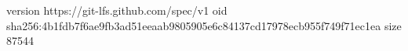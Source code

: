 version https://git-lfs.github.com/spec/v1
oid sha256:4b1fdb7f6ae9fb3ad51eeaab9805905e6c84137cd17978ecb955f749f71ec1ea
size 87544
